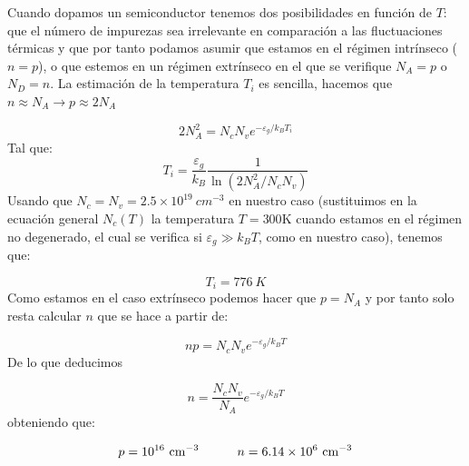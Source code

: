 \begin{solucion}
	Cuando dopamos un semiconductor tenemos dos posibilidades en función de $T$: que el número de impurezas sea irrelevante en comparación a las fluctuaciones térmicas y que por tanto podamos asumir que estamos en el régimen intrínseco ($n=p$), o que estemos en un régimen extrínseco en el que se verifique $N_A=p$ o $N_D=n$. La estimación de la temperatura $T_i$ es sencilla, hacemos que $n\approx N_A \rightarrow p \approx 2N_A$
	
	\begin{equation}
		2N_A^2 = N_c N_v e^{-\varepsilon_g / k_B T_i}
	\end{equation}
	Tal que:
	\begin{equation}
		T_i = \frac{\varepsilon_g}{k_B} \frac{1}{\ln (2N_A^2 / N_c N_v)}
	\end{equation}
	Usando que $N_c = N_v = 2.5 \times 10^{19} \ \unit{cm^{-3}}$ en nuestro caso (sustituimos en la ecuación general $N_c(T)$ la temperatura $T=300$K cuando estamos en el régimen no degenerado, el cual se verifica si $\varepsilon_g \gg k_B T$, como en nuestro caso), tenemos que:
	
	\begin{equation}
		T_i = 776 \ \unit{K}
	\end{equation}
	Como estamos en el caso extrínseco podemos hacer que $p=N_A$ y por tanto solo resta calcular $n$ que se hace a partir de:
	
	\begin{equation}
		n p = N_c N_v e^{-\varepsilon_g / k_B T}
	\end{equation}
	De lo que deducimos 
	
	\begin{equation}
		n  =  \frac{N_c N_v}{N_A} e^{-\varepsilon_g / k_B T}
	\end{equation}
	obteniendo que:
	
	\begin{equation}
		p = 10^{16} \ \unit{cm^{-3}} \tquad n = 6.14 \times 10^6 \ \unit{cm^{-3}}
	\end{equation}
	
\end{solucion}	


\newpage


